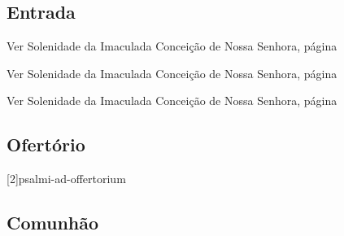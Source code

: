 
\subsection{Entrada}\label{subsection:proprium-sanctorum/in-annuntiatione-domini/psalmi-ad-introitum}

\begin{rubrica}
    Ver Solenidade da Imaculada Conceição de Nossa Senhora, página~\pageref{subsection:proprium-sanctorum/in-conceptione-immaculata-bmv/psalmus-responsorius}
\end{rubrica}

\begin{rubrica}
    Ver Solenidade da Imaculada Conceição de Nossa Senhora, página~\pageref{subsection:proprium-sanctorum/in-conceptione-immaculata-bmv/alleluia}
\end{rubrica}

\begin{rubrica}
    Ver Solenidade da Imaculada Conceição de Nossa Senhora, página~\pageref{subsection:proprium-sanctorum/in-conceptione-immaculata-bmv/psalmus-alleluiaticus}
\end{rubrica}

\AllowPageFlush

\subsection{Ofertório}\label{subsection:proprium-sanctorum/in-annuntiatione-domini/psalmi-ad-offertorium}
[2]{psalmi-ad-offertorium}

\subsection{Comunhão}\label{subsection:proprium-sanctorum/in-annuntiatione-domini/psalmi-ad-communionem}
